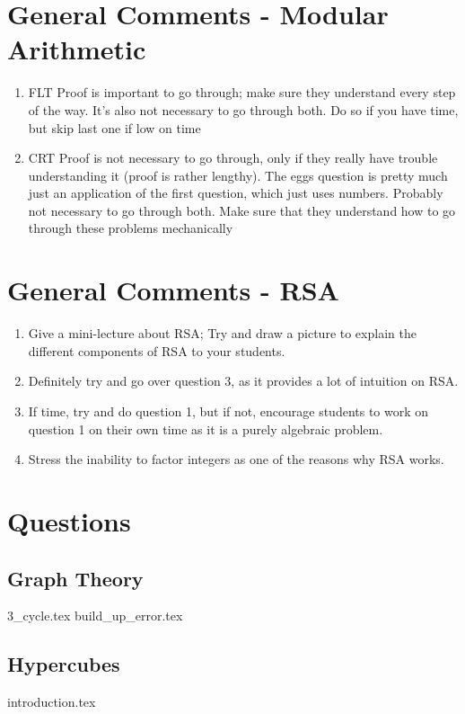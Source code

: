 \documentclass{exam}
\begin{document}
\section{General Comments - Modular Arithmetic}
\begin{enumerate}
\item FLT Proof is important to go through; make sure they understand every step of the way. It's also not necessary to go through both. Do so if you have time, but skip last one if low on time
\item CRT Proof is not necessary to go through, only if they really have trouble understanding it (proof is rather lengthy). The eggs question is pretty much just an application of the first question, which just uses numbers. Probably not necessary to go through both. Make sure that they understand how to go through these problems mechanically
\end{enumerate}

\section{General Comments - RSA}
\begin{enumerate}
\item Give a mini-lecture about RSA; Try and draw a picture to explain the different components of RSA to your students.
\item Definitely try and go over question 3, as it provides a lot of intuition on RSA.
\item If time, try and do question 1, but if not, encourage students to work on question 1 on their own time as it is a purely algebraic problem.
\item Stress the inability to factor integers as one of the reasons why RSA works.
\end{enumerate}


\clearpage 

\section{Questions}
\subsection{Graph Theory}
\begin{enumerate}
{3_cycle.tex}
{build_up_error.tex}
\end{enumerate}

\subsection{Hypercubes}
\begin{enumerate}
{introduction.tex}
\end{enumerate}
\end{document}
